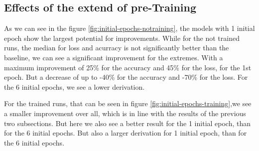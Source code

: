 \subsection{Effects of the extend of pre-Training}\label{subsec:effects-of-the-extend-of-pre-training}
As we can see in the figure \ref{fig:initial-epochs-notraining}, the models with 1 initial epoch show the largest potential for improvements.
While for the not trained runs, the median for loss and acurracy is not significantly better than the baseline, we can see a significant improvement for the extremes.
With a maximum improvement of 25\% for the accuracy and 45\% for the loss, for the 1st epoch.
But a decrease of up to -40\% for the accuracy and -70\% for the loss.
For the 6 initial epochs, we see a lower derivation.

For the trained runs, that can be seen in figure \ref{fig:initial-epochs-training},we see a smaller improvement over all, which is in line with the results of the previous two subsections.
But here we also see a better result for the 1 initial epoch, than for the 6 initial epochs.
But also a larger derivation for 1 initial epoch, than for the 6 initial epochs.

